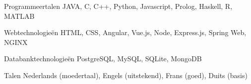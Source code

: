 

\begin{cvskills}

    \cvskill
    {Programmeertalen} %
    {JAVA, C, C++, Python, Javascript, Prolog, Haskell, R, MATLAB} %

  \cvskill
    {Webtechnologieën} %
    {HTML, CSS, Angular, Vue.js, Node, Express.js, Spring Web, NGINX} %

  \cvskill
    {Databanktechnologieën} %
    {PostgreSQL, MySQL, SQLite, MongoDB} %

  \cvskill
    {Talen} %
    {Nederlands (moedertaal), Engels (uitstekend), Frans (goed), Duits (basis)} %

\end{cvskills}

